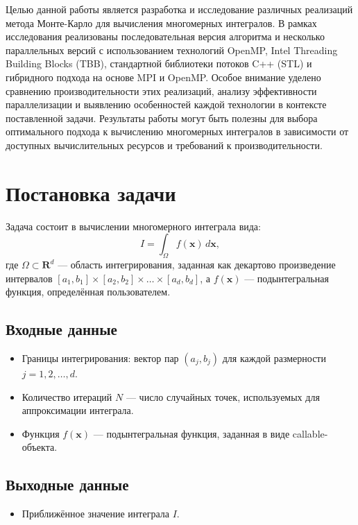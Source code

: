 \documentclass[12pt,a4paper]{extarticle}
\begin{document}
Целью данной работы является разработка и исследование различных реализаций метода Монте-Карло для вычисления многомерных интегралов. В рамках исследования реализованы последовательная версия алгоритма и несколько параллельных версий с использованием технологий OpenMP, Intel Threading Building Blocks (TBB), стандартной библиотеки потоков C++ (STL) и гибридного подхода на основе MPI и OpenMP. Особое внимание уделено сравнению производительности этих реализаций, анализу эффективности параллелизации и выявлению особенностей каждой технологии в контексте поставленной задачи. Результаты работы могут быть полезны для выбора оптимального подхода к вычислению многомерных интегралов в зависимости от доступных вычислительных ресурсов и требований к производительности.

\newpage
\section{Постановка задачи}
Задача состоит в вычислении многомерного интеграла вида:
\[
I = \int_{\Omega} f(\mathbf{x}) \, d\mathbf{x},
\]
где \(\Omega \subset \mathbf{R}^d\) — область интегрирования, заданная как декартово произведение интервалов \([a_1, b_1] \times [a_2, b_2] \times \ldots \times [a_d, b_d]\), а \(f(\mathbf{x})\) — подынтегральная функция, определённая пользователем.

\subsection{Входные данные}
\begin{itemize}
    \item Границы интегрирования: вектор пар \((a_j, b_j)\) для каждой размерности \(j = 1, 2, \ldots, d\).
    \item Количество итераций \(N\) — число случайных точек, используемых для аппроксимации интеграла.
    \item Функция \(f(\mathbf{x})\) — подынтегральная функция, заданная в виде callable-объекта.
\end{itemize}

\subsection{Выходные данные}
\begin{itemize}
    \item Приближённое значение интеграла \(I\).
\end{itemize}
\end{document}

